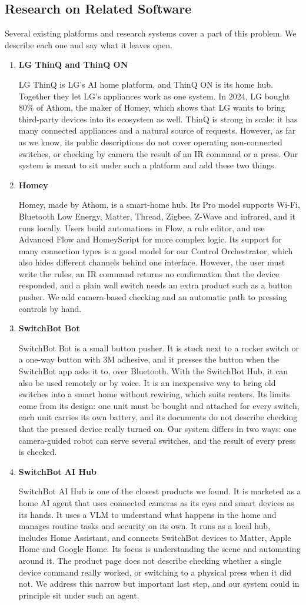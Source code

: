 \documentclass[conference]{IEEEtran}
\newcommand{\itemhead}[1]{\item \textbf{#1}\par\nobreak}
\begin{document}
\subsection{Research on Related Software}
Several existing platforms and research systems cover a part of this problem. We describe each one and say what it leaves open.
\begin{enumerate}
\itemhead{LG ThinQ and ThinQ ON}
LG ThinQ is LG's AI home platform, and ThinQ ON is its home hub. Together they let LG's appliances work as one system. In 2024, LG bought 80\% of Athom, the maker of Homey, which shows that LG wants to bring third-party devices into its ecosystem as well. ThinQ is strong in scale: it has many connected appliances and a natural source of requests. However, as far as we know, its public descriptions do not cover operating non-connected switches, or checking by camera the result of an IR command or a press. Our system is meant to sit under such a platform and add these two things.

\itemhead{Homey}
Homey, made by Athom, is a smart-home hub. Its Pro model supports Wi-Fi, Bluetooth Low Energy, Matter, Thread, Zigbee, Z-Wave and infrared, and it runs locally. Users build automations in Flow, a rule editor, and use Advanced Flow and HomeyScript for more complex logic. Its support for many connection types is a good model for our Control Orchestrator, which also hides different channels behind one interface. However, the user must write the rules, an IR command returns no confirmation that the device responded, and a plain wall switch needs an extra product such as a button pusher. We add camera-based checking and an automatic path to pressing controls by hand.

\itemhead{SwitchBot Bot}
SwitchBot Bot is a small button pusher. It is stuck next to a rocker switch or a one-way button with 3M adhesive, and it presses the button when the SwitchBot app asks it to, over Bluetooth. With the SwitchBot Hub, it can also be used remotely or by voice. It is an inexpensive way to bring old switches into a smart home without rewiring, which suits renters. Its limits come from its design: one unit must be bought and attached for every switch, each unit carries its own battery, and its documents do not describe checking that the pressed device really turned on. Our system differs in two ways: one camera-guided robot can serve several switches, and the result of every press is checked.

\itemhead{SwitchBot AI Hub}
SwitchBot AI Hub is one of the closest products we found. It is marketed as a home AI agent that uses connected cameras as its eyes and smart devices as its hands. It uses a VLM to understand what happens in the home and manages routine tasks and security on its own. It runs as a local hub, includes Home Assistant, and connects SwitchBot devices to Matter, Apple Home and Google Home. Its focus is understanding the scene and automating around it. The product page does not describe checking whether a single device command really worked, or switching to a physical press when it did not. We address this narrow but important last step, and our system could in principle sit under such an agent.


\end{enumerate}
\end{document}
